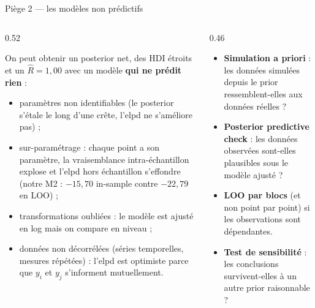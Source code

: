 \begin{frame}{Piège 2 --- les modèles non prédictifs}
\begin{columns}[t]
\begin{column}{0.52\textwidth}
\begin{wbox}
On peut obtenir un posterior net, des HDI étroits et un $\hat R = 1{,}00$
avec un modèle \textbf{qui ne prédit rien} :
\begin{itemize}
  \item paramètres non identifiables (le posterior s'étale le long d'une
        crête, l'elpd ne s'améliore pas) ;
  \item sur-paramétrage : chaque point a son paramètre, la vraisemblance
        intra-échantillon explose et l'elpd hors échantillon s'effondre
        (notre M2 : $-15{,}70$ in-sample contre $-22{,}79$ en LOO) ;
  \item transformations oubliées : le modèle est ajusté en log mais on
        compare en niveau ;
  \item données non décorrélées (séries temporelles, mesures répétées) :
        l'elpd est optimiste parce que $y_i$ et $y_j$ s'informent
        mutuellement.
\end{itemize}
\end{wbox}
\end{column}
\begin{column}{0.46\textwidth}
\begin{kbox}
\begin{itemize}
  \item \textbf{Simulation a priori} : les données simulées depuis le prior
        ressemblent-elles aux données réelles ?
  \item \textbf{Posterior predictive check} : les données observées sont-elles
        plausibles sous le modèle ajusté ?
  \item \textbf{LOO par blocs} (et non point par point) si les observations
        sont dépendantes.
  \item \textbf{Test de sensibilité} : les conclusions survivent-elles à un
        autre prior raisonnable ?
\end{itemize}
\end{kbox}
\end{column}
\end{columns}
\end{frame}

